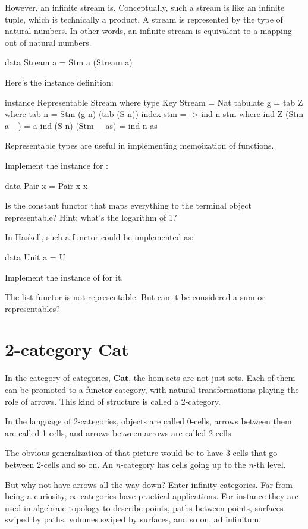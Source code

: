 \documentclass[DaoFP]{subfiles}
\begin{document}
However, an infinite stream is. Conceptually, such a stream is like an infinite tuple, which is technically a product. A stream is represented by the type of natural numbers. In other words, an infinite stream is equivalent to a mapping out of natural numbers. 
\begin{haskell}
data Stream a = Stm a (Stream a)
\end{haskell}
Here's the instance definition:
\begin{haskell}
instance Representable Stream where
  type Key Stream = Nat
  tabulate g = tab Z
    where
      tab n = Stm (g n) (tab (S n))
  index stm = \n -> ind n stm
    where
      ind Z (Stm a _) = a
      ind (S n) (Stm _ as) = ind n as
\end{haskell}
Representable types are useful in implementing memoization of functions.

\begin{exercise}
Implement the  instance for :
\begin{haskell}
data Pair x = Pair x x
\end{haskell}
\end{exercise}

\begin{exercise}
Is the constant functor that maps everything to the terminal object representable? Hint: what's the logarithm of 1?

In Haskell, such a functor could be implemented as:
\begin{haskell}
data Unit a = U
\end{haskell}
Implement the instance of  for it.
\end{exercise}

\begin{exercise}
The list functor is not representable. But can it be considered a sum or representables?
\end{exercise}

\section{2-category  $\mathbf{Cat}$ }

In the category of categories, $\mathbf{Cat}$, the hom-sets are not just sets. Each of them can be promoted to a functor category, with natural transformations playing the role of arrows. This kind of structure is called a 2-category. 

In the language of 2-categories, objects are called 0-cells, arrows between them are called 1-cells, and arrows between arrows are called 2-cells. 

The obvious generalization of that picture would be to have 3-cells that go between 2-cells and so on. An $n$-category has cells going up to the $n$-th level. 

But why not have arrows all the way down? Enter infinity categories. Far from being a curiosity, $\infty$-categories have practical applications. For instance they are used in algebraic topology to describe points, paths between points, surfaces swiped by paths, volumes swiped by surfaces, and so on, ad infinitum. 
\end{document}
